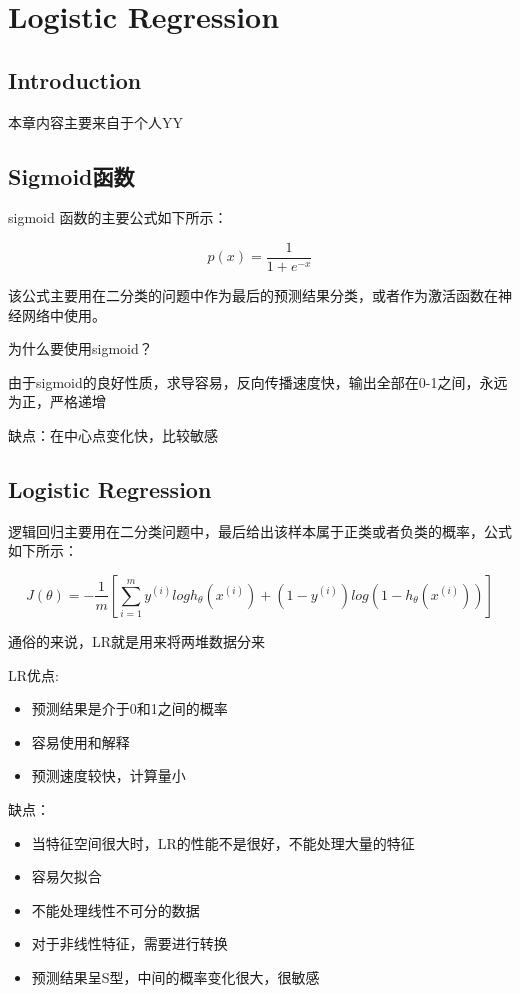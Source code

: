 \chapter{Logistic Regression}

\section*{Introduction}
	本章内容主要来自于个人YY

\section{Sigmoid函数}
	\boldmath  %
	sigmoid 函数的主要公式如下所示：
	
	\begin{equation}
		p(x) = \frac{1}{1+e^{-x}}
	\end{equation}		
	
	该公式主要用在二分类的问题中作为最后的预测结果分类，或者作为激活函数在神经网络中使用。
	
	为什么要使用sigmoid？
	
	由于sigmoid的良好性质，求导容易，反向传播速度快，输出全部在0-1之间，永远为正，严格递增
	
	缺点：在中心点变化快，比较敏感
	

\section{Logistic Regression}
	\boldmath  %
	逻辑回归主要用在二分类问题中，最后给出该样本属于正类或者负类的概率，公式如下所示：
	
	\begin{equation}
		J(\theta) = - \frac{1}{m} \left[ \sum_{i=1}^{m} y^{(i)} log h_\theta(x^{(i)})+ (1-y^{(i)})log(1-h_\theta(x^{(i)})) \right]	
	
	\end{equation}
	
	通俗的来说，LR就是用来将两堆数据分来
	
	LR优点:
	
	\begin{itemize}
		\item 预测结果是介于0和1之间的概率
		\item 容易使用和解释
		\item 预测速度较快，计算量小
	\end{itemize}
	
	缺点：
	\begin{itemize}
		\item 当特征空间很大时，LR的性能不是很好，不能处理大量的特征
		\item 容易欠拟合
		\item 不能处理线性不可分的数据
		\item 对于非线性特征，需要进行转换
		\item 预测结果呈S型，中间的概率变化很大，很敏感
	\end{itemize}



